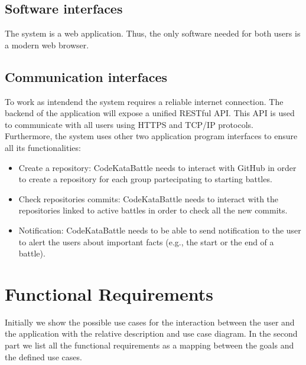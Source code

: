 \documentclass[12pt, a4paper]{report}
\begin{document}
        \subsection{Software interfaces}
        The system is a web application. 
        Thus, the only software needed for both users is a modern web browser. 

        \subsection{Communication interfaces}
        To work as intendend the system requires a reliable internet connection. 
        The backend of the application will expose a unified RESTful API. 
        This API is used to communicate with all users using HTTPS and TCP/IP protocols. \\
        Furthermore, the system uses other two application program interfaces to ensure all its functionalities: 
        \begin{itemize}
            \item Create a repository: CodeKataBattle needs to interact with GitHub in order to create a repository for each group partecipating to starting battles. 
            \item Check repositories commits: CodeKataBattle needs to interact with the repositories linked to active battles in order to check all the new commits. 
            \item Notification: CodeKataBattle needs to be able to send notification to the user to alert the users about important facts (e.g., the start or the end of a battle). 
        \end{itemize}

    \section{Functional Requirements}
        Initially we show the possible use cases for the interaction between the user and the application with the relative description and use case diagram. 
        In the second part we list all the functional requirements as a mapping between the goals and the defined use cases. 
\end{document}
